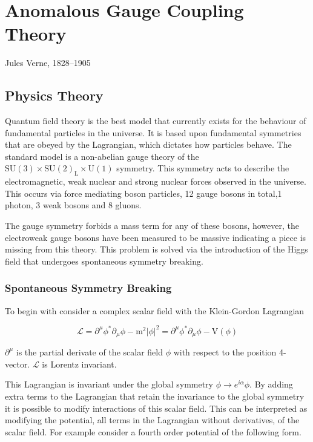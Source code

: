 \chapter{Anomalous Gauge Coupling Theory}
\label{chap:anomalousgaugecouplingtheory}

{Jules Verne, 1828--1905}

\section{Physics Theory}
Quantum field theory is the best model that currently exists for the behaviour of fundamental particles in the universe.  It is based upon fundamental symmetries that are obeyed by the Lagrangian, which dictates how particles behave.  The standard model is a non-abelian gauge theory of the $\text{SU}(3) \times \text{SU}(2)_{\text{L}} \times \text{U}(1)$ symmetry.  This symmetry acts to describe the electromagnetic, weak nuclear and strong nuclear forces observed in the universe.  This occurs via force mediating boson particles, 12 gauge bosons in total,1 photon, 3 weak bosons and 8 gluons.  

The gauge symmetry forbids a mass term for any of these bosons, however, the electroweak gauge bosons have been measured to be massive indicating a piece is missing from this theory.  This problem is solved via the introduction of the Higgs field that undergoes spontaneous symmetry breaking.

\subsection{Spontaneous Symmetry Breaking}
\label{sec:ssb}
To begin with consider a complex scalar field \phi with the Klein-Gordon Lagrangian

\begin{equation}
\mathcal{L} = \partial^{\mu} \phi^{*} \partial_{\mu} \phi - \text{m}^{2} |\phi|^{2} = \partial^{\mu} \phi^{*} \partial_{\mu} \phi - \text{V}(\phi)
\end{equation}

$\partial^{\mu}$ is the partial derivate of the scalar field $\phi$ with respect to the position 4-vector.  $\mathcal{L}$ is Lorentz invariant.

This Lagrangian is invariant under the global symmetry $\phi \rightarrow e^{i\alpha} \phi$.  By adding extra terms to the Lagrangian that retain the invariance to the global symmetry it is possible to modify interactions of this scalar field.  This can be interpreted as modifying the potential, all terms in the Lagrangian without derivatives, of the scalar field.  For example consider a fourth order potential of the following form.


